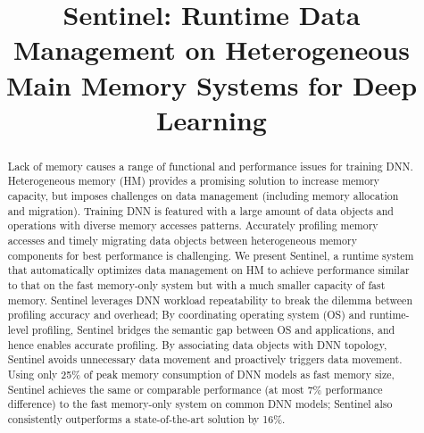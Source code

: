 \documentclass[sigconf,anonymous]{acmart}
\newcommand{\name}{Sentinel\xspace}
\begin{document}

\date{}

\title{\name: Runtime Data Management on Heterogeneous Main Memory Systems for Deep Learning}


\begin{abstract}

Lack of memory causes a range of functional and performance issues for training DNN. Heterogeneous memory (HM) provides a promising solution to increase memory capacity, but imposes challenges on data management (including memory allocation and migration). Training DNN is featured with a large amount of data objects and operations with diverse memory accesses patterns. Accurately profiling memory accesses and timely migrating data objects between heterogeneous memory components for best performance is challenging. We present \name, a runtime system that automatically optimizes data management on HM to achieve performance similar to that on the fast memory-only system but with a much smaller capacity of fast memory. \name leverages DNN workload repeatability to break the dilemma between profiling accuracy and overhead; By coordinating operating system (OS) and runtime-level profiling, \name bridges the semantic gap between OS and applications, and hence enables accurate profiling. By associating data objects with DNN topology, \name avoids unnecessary data movement and proactively triggers data movement. Using only \textcolor{check}{25\% of peak memory consumption of DNN models as fast memory size, \name achieves the same or comparable performance (at most 7\% performance difference) to the fast memory-only system on common DNN models; \name also consistently outperforms a state-of-the-art solution by 16\%.} 



\end{abstract}
\end{document}
